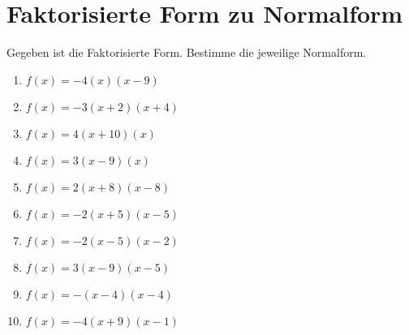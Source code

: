 \documentclass{article}%
\begin{document}
\section{Faktorisierte Form zu Normalform}%
\label{sec:FaktorisierteFormzuNormalform}%
Gegeben ist die Faktorisierte Form. Bestimme die jeweilige Normalform.%
\begin{enumerate}[label=\alph*)]%
\item%
\newline\vspace{0.5cm} $f(x)=-4(x)(x-9)$%
\item%
\newline\vspace{0.5cm} $f(x)=-3(x+2)(x+4)$%
\item%
\newline\vspace{0.5cm} $f(x)=4(x+10)(x)$%
\item%
\newline\vspace{0.5cm} $f(x)=3(x-9)(x)$%
\item%
\newline\vspace{0.5cm} $f(x)=2(x+8)(x-8)$%
\item%
\newline\vspace{0.5cm} $f(x)=-2(x+5)(x-5)$%
\item%
\newline\vspace{0.5cm} $f(x)=-2(x-5)(x-2)$%
\item%
\newline\vspace{0.5cm} $f(x)=3(x-9)(x-5)$%
\item%
\newline\vspace{0.5cm} $f(x)=-(x-4)(x-4)$%
\item%
\newline\vspace{0.5cm} $f(x)=-4(x+9)(x-1)$%
\end{enumerate}

%
\end{document}
